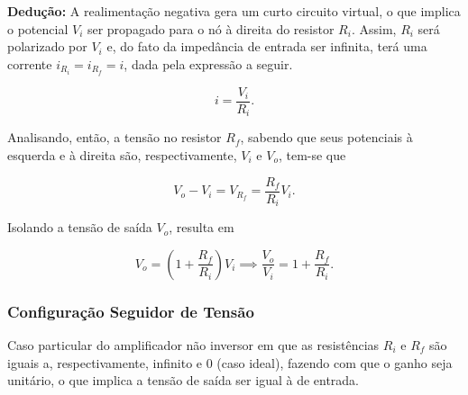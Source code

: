 \documentclass{article}
\numberwithin{equation}{section}
\newcommand{\curtovirtual}{($(opamp.+)+(0.3,0)$) to[open,v^=$ $, l=0, voltage shift=1] ($(opamp.-)+(0.3,0)$)}
\let\dfr\dfrac
\begin{document}
\textbf{Dedução:} A realimentação negativa gera um curto circuito virtual, o que implica o potencial $V_i$ ser propagado para o nó à direita do resistor $R_i$. Assim, $R_i$ será polarizado por $V_i$ e, do fato da impedância de entrada ser infinita, terá uma corrente $i_{R_i} = i_{R_f} = i$, dada pela expressão a seguir.

\begin{center}
\end{center}

\begin{equation*}
    i = \dfr{V_i}{R_i}.
\end{equation*}

\noindent Analisando, então, a tensão no resistor $R_f$, sabendo que seus potenciais à esquerda e à direita são, respectivamente, $V_i$ e $V_o$, tem-se que

\begin{equation*}
    V_o - V_i = V_{R_f} = \dfr{R_f}{R_i} V_i.
\end{equation*}

\noindent Isolando a tensão de saída $V_o$, resulta em

\begin{equation*}
    V_o = \left(1+\dfr{R_f}{R_i}\right) V_i \implies \dfr{V_o}{V_i} = 1+\dfr{R_f}{R_i}.
\end{equation*}

\subsubsection{Configuração Seguidor de Tensão}
Caso particular do amplificador não inversor em que as resistências $R_{i}$ e $R_{f}$ são iguais a, respectivamente, infinito e $0$ (caso ideal), fazendo com que o ganho seja unitário, o que implica a tensão de saída ser igual à de entrada.

\begin{center}
\end{center}
\end{document}
